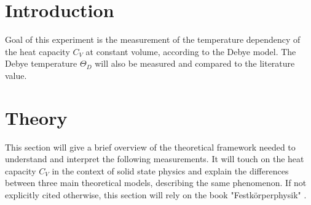 \section{Introduction}
\label{sec:Zielsetzung}
Goal of this experiment is the measurement of the temperature dependency of the heat capacity $C_V$ at constant volume, according to the Debye model. 
The Debye temperature $\Theta_D$ will also be measured and compared to the literature value.

\section{Theory}
\label{sec:Theorie}
This section will give a brief overview of the theoretical framework needed to understand and interpret the following measurements. It will touch on the heat capacity $C_V$ in the context of solid state physics and explain the differences between three main theoretical models, describing the same phenomenon.
If not explicitly cited otherwise, this section will rely on the book "Festkörperphysik" \cite{rehab}.
